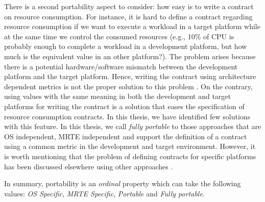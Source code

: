 \begin{itemize}
There is a second portability aspect to consider: how easy is to write a contract on resource consumption.
For instance, it is hard to define a contract regarding resource consumption if we want to execute a workload in a target platform while at the same time we control the consumed resources (e.g., 10\% of CPU is probably enough to complete a workload in a development platform, but how much is the equivalent value in an other platform?).
The problem arises because there is a potential hardware/software mismatch between the development platform and the target platform.
Hence, writing the contract using architecture dependent metrics is not the proper solution to this problem \cite{no se}.
On the contrary, using values with the same meaning in both the development and target platforms for writing the contract is a solution that eases the specification of resource consumption contracts.
In this thesis, we have identified few solutions with this feature.
In this thesis, we call \textit{fully portable} to those approaches that are OS independent, MRTE independent and support the definition of a contract using a common metric in the development and target environment.
However, it is worth mentioning that the problem of defining contracts for specific platforms has been discussed elsewhere using other approaches \cite{otros}.

In summary, portability is an \textit{ordinal} property which can take the following values: \textit{OS Specific}, \textit{MRTE Specific}, \textit{Portable} and  \textit{Fully portable}.


\end{itemize}
